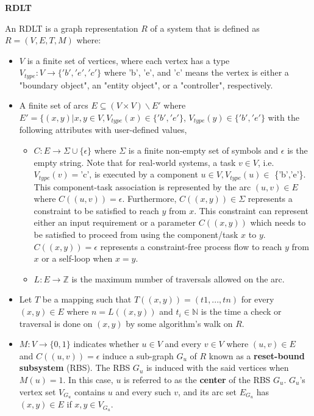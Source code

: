 \documentclass[12pt]{article}
\begin{document}
    \begin{definition} \textbf{RDLT} \cite{malinao-rdlt}

    An RDLT is a graph representation $R$ of a system that is defined as $R = (V, E, T, M)$ where:

    \begin{itemize}

        \item $V$ is a finite set of vertices, where each vertex has a type $V_{type}: V \rightarrow \{'b', 'e', 'c'\}$ where 'b', 'e', and 'c' means the vertex is either a "boundary object", an "entity object", or a "controller", respectively.

        \item A finite set of arcs $E \subseteq (V \times V) \backslash  E'$ where $E' = \{(x,y) | x,y \in V, V_{type}(x) \in \{'b', 'e'\}$, $V_{type}(y) \in \{'b', 'e'\}$ with the following attributes with user-defined values,

        \begin{itemize}

            \item $C : E \rightarrow \Sigma \cup \{\epsilon\}$ where $\Sigma$ is a finite non-empty set of symbols and $\epsilon$ is the empty string. Note that for real-world systems, a task $v \in V$, i.e. $V_{type}(v) = $'c', is executed by a component $u \in V, V_{type}(u) \in $ \{'b','e'\}. This component-task association is represented by the arc $(u, v) \in E$ where $C((u,v)) = \epsilon$. Furthermore, $C((x,y)) \in \Sigma$ represents a constraint to be satisfied to reach $y$ from $x$. This constraint can represent either an input requirement or a parameter $C((x,y))$ which needs to be satisfied to proceed from using the component/task $x$ to $y$. $C((x,y)) = \epsilon$ represents a constraint-free process flow to reach $y$ from $x$ or a self-loop when $x = y$.

            \item $L : E \rightarrow \mathbb{Z}$ is the maximum number of traversals allowed on the arc.

        \end{itemize}

        \item Let $T$ be a mapping such that $T((x, y)) = (t1,...,tn)$ for every $(x, y) \in E$ where $n = L((x, y))$ and $ t_{i} \in \mathbb{N}$ is the time a check or traversal is done on $(x, y)$ by some algorithm’s walk on $R$.

        \item $M : V \rightarrow \{0,1\}$ indicates whether $u \in V$ and every $v \in V$ where $(u,v) \in E$ and $C((u,v)) = \epsilon$ induce a sub-graph $G_{u}$ of $R$ known as a \textbf{reset-bound subsystem} (RBS). The RBS $G_{u}$ is induced with the said vertices when $M(u) = 1$. In this case, $u$ is referred to as the \textbf{center} of the RBS $G_{u}$. $G_{u}$'s vertex set $V_{G_{u}}$ contains $u$ and every such $v$, and its arc set $E_{G_{u}}$ has $(x,y) \in E$ if $x,y \in V_{G_{u}}$. \\


\end{itemize}
\end{definition}
\end{document}
